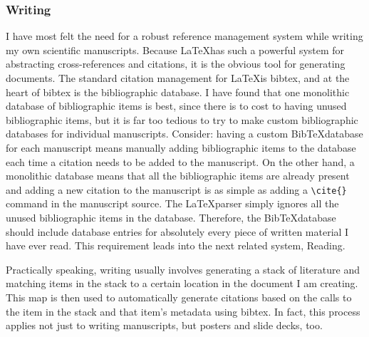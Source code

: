 \documentclass[letterpaper,12pt]{article}
\begin{document}
\subsubsection{Writing}
I have most felt the need for a robust reference management system while writing my own scientific manuscripts. Because \LaTeX has such a powerful system for abstracting cross-references and citations, it is the obvious tool for generating documents. The standard citation management for \LaTeX is bibtex, and at the heart of bibtex is the bibliographic database. I have found that one monolithic database of bibliographic items is best, since there is to cost to having unused bibliographic items, but it is far too tedious to try to make custom bibliographic databases for individual manuscripts. Consider: having a custom Bib\TeX database for each manuscript means manually adding bibliographic items to the database each time a citation needs to be added to the manuscript. On the other hand, a monolithic database means that all the bibliographic items are already present and adding a new citation to the manuscript is as simple as adding a \verb|\cite{}| command in the manuscript source. The \LaTeX parser simply ignores all the unused bibliographic items in the database. Therefore, the Bib\TeX database should include database entries for absolutely every piece of written material I have ever read. This requirement leads into the next related system, Reading.

Practically speaking, writing usually involves generating a stack of literature and matching items in the stack to a certain location in the document I am creating. This map is then used to automatically generate citations based on the calls to the item in the stack and that item's metadata using bibtex. In fact, this process applies not just to writing manuscripts, but posters and slide decks, too.
\end{document}
